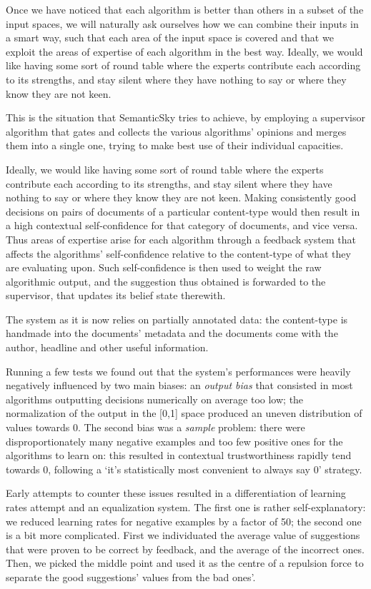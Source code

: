 \documentclass[11pt]{article}
\begin{document}
Once we have noticed that each algorithm is better than others in a subset of the input spaces, we will naturally ask ourselves how we can combine their inputs in a smart way, such that each area of the input space is covered and that we exploit the areas of expertise of each algorithm in the best way. Ideally, we would like having some sort of round table where the experts contribute each according to its strengths, and stay silent where they have nothing to say or where they know they are not keen.

This is the situation that SemanticSky tries to achieve, by employing a supervisor algorithm that gates and collects the various algorithms' opinions and merges them into a single one, trying to make best use of their individual capacities.

Ideally, we would like having some sort of round table where the experts contribute each according to its strengths, and stay silent where they have nothing to say or where they know they are not keen. Making consistently good decisions on pairs of documents of a particular content-type would then result in a high contextual self-confidence for that category of documents, and vice versa. Thus areas of expertise arise for each algorithm through a feedback system that affects the algorithms' self-confidence relative to the content-type of what they are evaluating upon. Such self-confidence is then used to weight the raw algorithmic output, and the suggestion thus obtained is forwarded to the supervisor, that updates its belief state therewith.

The system as it is now relies on partially annotated data: the content-type is handmade into the documents' metadata and the documents come with the author, headline and other useful information.

Running a few tests we found out that the system's performances were heavily negatively influenced by two main biases: an \emph{output bias} that consisted in most algorithms outputting decisions numerically on average too low; the normalization of the output in the [0,1] space produced an uneven distribution of values towards 0. 
The second bias was a \emph{sample} problem: there were disproportionately many negative examples and too few positive ones for the algorithms to learn on: this resulted in contextual trustworthiness rapidly tend towards 0, following a `it's statistically most convenient to always say 0' strategy.

Early attempts to counter these issues resulted in a differentiation of learning rates attempt and an equalization system. The first one is rather self-explanatory: we reduced learning rates for negative examples by a factor of 50; the second one is a bit more complicated. First we individuated the average value of suggestions that were proven to be correct by feedback, and the average of the incorrect ones. Then, we picked the middle point and used it as the centre of a repulsion force to separate the good suggestions' values from the bad ones'.
\end{document}
